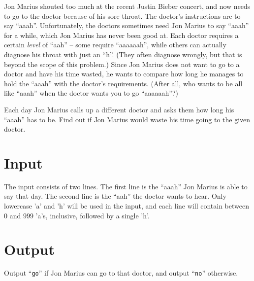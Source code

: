 



Jon Marius shouted too much at the recent Justin Bieber concert, and now needs 
to go to the doctor because of his sore throat. The doctor's instructions are 
to say ``aaah''. Unfortunately, the doctors sometimes need Jon Marius to say 
``aaah'' for a while, which Jon Marius has never been good at. Each doctor 
requires a certain \emph{level} of ``aah'' -- some require ``aaaaaah'', while 
others can actually diagnose his throat with just an ``h''. (They often diagnose 
wrongly, but that is beyond the scope of this problem.) Since Jon Marius does 
not want to go to a doctor and have his time wasted, he wants to compare how 
long he manages to hold the ``aaah'' with the doctor's requirements. (After all, 
who wants to be all like ``aaah'' when the doctor wants you to go ``aaaaaah''?) 

Each day Jon Marius calls up a different doctor and asks them how long his 
``aaah'' has to be. Find out if Jon Marius would waste his time going to the 
given doctor.

\section*{Input}
The input consists of two lines. The first line is the ``aaah'' Jon Marius is 
able to say that day. The second line is the ``aah'' the doctor wants to hear. 
Only lowercase 'a' and 'h' will be used in the input, and each line will contain 
between $0$ and $999$ 'a's, inclusive, followed by a single 'h'.

\section*{Output}
Output ``{\tt go}'' if Jon Marius can go to that doctor, and output ``{\tt no}'' otherwise. 
